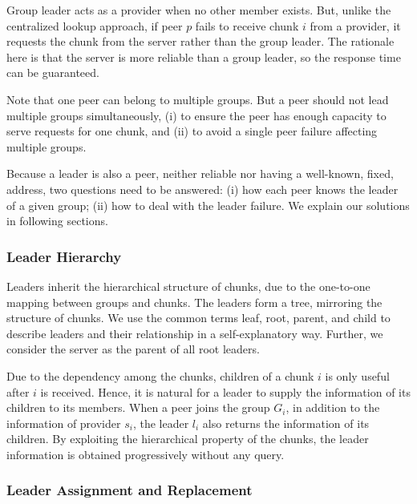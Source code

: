     Group leader acts as a provider when no other member
    exists.  But, unlike the centralized lookup approach, %
    if peer $p$ fails to receive chunk $i$ from a provider, it requests
    the chunk from the server rather than the group leader.  The
    rationale here is that the server is more reliable than
    a group leader, so the response time can be guaranteed.

    Note that one peer can belong to multiple groups.  But a
    peer should not lead multiple groups
    simultaneously, (i) to ensure the peer has enough
    capacity to serve requests for one chunk, and (ii) to
    avoid a single peer failure affecting multiple
    groups.

    Because a leader is also a peer, neither reliable nor
    having a well-known, fixed, address, two questions need
    to be answered: (i) how each peer knows the leader of a
    given group; (ii) how to deal with the leader failure.
    We explain our solutions in following sections.

    \subsubsection{Leader Hierarchy}

    Leaders inherit the hierarchical structure of
    chunks, due to the one-to-one mapping
    between groups and chunks.  The leaders form a tree, 
    mirroring the structure of chunks.  We use the common terms 
    leaf, root, parent, and child to describe leaders and their 
    relationship in a self-explanatory way.  Further, 
    we consider the server as the parent of all root leaders.
    
    Due to the dependency among the chunks, children of a
    chunk $i$ is only useful after $i$ is received.  Hence,
    it is natural for a leader to supply the information of
    its children to its members.  When a peer joins the
    group $G_i$, in addition to the information of provider
    $s_i$, the leader $l_i$ also returns the information of its children.
    By exploiting the hierarchical property of the chunks, the 
    leader information is obtained progressively without any query.

\subsubsection{Leader Assignment and Replacement}

